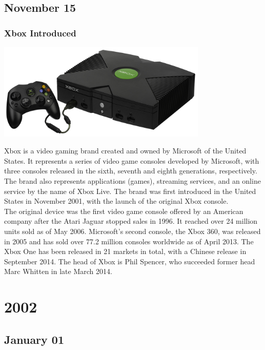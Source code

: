 \documentclass[11pt]{report}
\begin{document}
\section{November 15}
\subsection{Xbox Introduced}
\vspace{2mm}\begin{center}\includegraphics[width=10cm]{./img/xbox1.jpg}\end{center}
Xbox is a video gaming brand created and owned by Microsoft of the United States. It represents a series of video game consoles developed by Microsoft, with three consoles released in the sixth, seventh and eighth generations, respectively. The brand also represents applications (games), streaming services, and an online service by the name of Xbox Live. The brand was first introduced in the United States in November 2001, with the launch of the original Xbox console.\\
The original device was the first video game console offered by an American company after the Atari Jaguar stopped sales in 1996. It reached over 24 million units sold as of May 2006. Microsoft's second console, the Xbox 360, was released in 2005 and has sold over 77.2 million consoles worldwide as of April 2013. The Xbox One has been released in 21 markets in total, with a Chinese release in September 2014. The head of Xbox is Phil Spencer, who succeeded former head Marc Whitten in late March 2014.

\chapter{2002}
\section{January 01}
\end{document}
